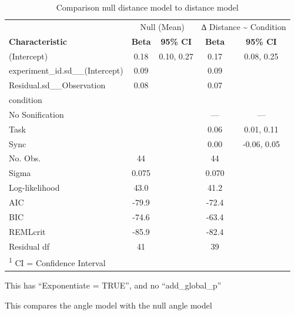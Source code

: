 \documentclass[10pt,a4paper,onecolumn]{article}
\begin{document}
\begin{table}

\caption{\label{tab:regression-results-dist}Comparison null distance model to distance model}
\centering
\fontsize{7}{9}\selectfont
\begin{tabular}[t]{lcccc}
\toprule
\multicolumn{1}{c}{ } & \multicolumn{2}{c}{Null (Mean)} & \multicolumn{2}{c}{∆ Distance \textasciitilde{} Condition} \\
\cmidrule(l{3pt}r{3pt}){2-3} \cmidrule(l{3pt}r{3pt}){4-5}
\textbf{Characteristic} & \textbf{Beta} & \textbf{95\% CI} & \textbf{Beta} & \textbf{95\% CI}\\
\midrule
(Intercept) & 0.18 & 0.10, 0.27 & 0.17 & 0.08, 0.25\\
experiment\_id.sd\_\_(Intercept) & 0.09 &  & 0.09 & \\
Residual.sd\_\_Observation & 0.08 &  & 0.07 & \\
condition &  &  &  & \\
\hspace{1em}No Sonification &  &  & — & —\\
\addlinespace
\hspace{1em}Task &  &  & 0.06 & 0.01, 0.11\\
\hspace{1em}Sync &  &  & 0.00 & -0.06, 0.05\\
\midrule
No. Obs. & 44 &  & 44 & \\
Sigma & 0.075 &  & 0.070 & \\
Log-likelihood & 43.0 &  & 41.2 & \\
\addlinespace
AIC & -79.9 &  & -72.4 & \\
BIC & -74.6 &  & -63.4 & \\
REMLcrit & -85.9 &  & -82.4 & \\
Residual df & 41 &  & 39 & \\
\bottomrule
\multicolumn{5}{l}{\rule{0pt}{1em}\textsuperscript{1} CI = Confidence Interval}\\
\end{tabular}
\end{table}

This has ``Exponentiate = TRUE'', and no ``add\_global\_p''

This compares the angle model with the null angle model
\end{document}
